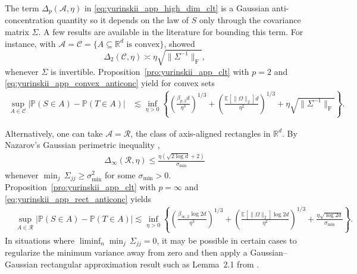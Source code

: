 \documentclass[11pt,lof]{puthesis}
\renewcommand{\P}{\ensuremath{\mathbb{P}}}
\newcommand{\R}{\ensuremath{\mathbb{R}}}
\newcommand{\E}{\ensuremath{\mathbb{E}}}
\newcommand{\rF}{\ensuremath{\mathrm{F}}}
\newcommand{\cR}{\ensuremath{\mathcal{R}}}
\newcommand{\cA}{\ensuremath{\mathcal{A}}}
\newcommand{\cC}{\ensuremath{\mathcal{C}}}
\theoremstyle{break}
\theoremstyle{proof}
\begin{document}
The term $\Delta_p(\cA, \eta)$
in \eqref{eq:yurinskii_app_high_dim_clt} is a Gaussian anti-concentration
quantity so it depends on the law of $S$ only through the covariance matrix
$\Sigma$.
A few results are available in the literature
for bounding this term.
For instance, with
$\cA = \cC = \{A \subseteq \R^d \text{ is convex}\}$,
\citet{nazarov2003maximal} showed
%
\begin{equation}%
  \label{eq:yurinskii_app_convex_anticonc}
  \Delta_2(\cC, \eta)
  \asymp
  \eta\sqrt{\|\Sigma^{-1}\|_{\rF}},
\end{equation}
%
whenever $\Sigma$ is invertible.
Proposition~\ref{pro:yurinskii_app_clt} with $p=2$
and \eqref{eq:yurinskii_app_convex_anticonc} yield for convex sets
%
\begin{align*}
  \sup_{A\in \cC}
  \big|\P(S\in A) -\P(T\in A)\big|
  &\lesssim
  \inf_{\eta > 0}
  \left\{
    \left(\frac{\beta_{p,2} d}{\eta^3}\right)^{1/3}
    + \left(\frac{\E[\|\Omega \|_2] d}{\eta^2}\right)^{1/3}
    + \eta \sqrt{\|\Sigma^{-1}\|_\rF}
  \right\}.
\end{align*}

Alternatively, one can take $\cA = \cR$,
the class of axis-aligned rectangles in $\R^d$.
By Nazarov's Gaussian perimetric inequality
\citep{nazarov2003maximal,chernozhukov2017central},
%
\begin{align}%
  \label{eq:yurinskii_app_rect_anticonc}
  \Delta_\infty(\cR, \eta)
  \leq \frac{\eta (\sqrt{2\log d} + 2)}{\sigma_{\min}}
\end{align}
%
whenever $\min_j \, \Sigma_{j j} \geq \sigma_{\min}^2$
for some $\sigma_{\min}>0$.
Proposition~\ref{pro:yurinskii_app_clt} with $p = \infty$
and \eqref{eq:yurinskii_app_rect_anticonc} yields
%
\begin{align*}%
  &\sup_{A\in \cR}
  \big|\P(S\in A) -\P(T\in A)\big|
  \lesssim
  \inf_{\eta > 0}
  \left\{
    \left(\frac{\beta_{\infty,2} \log 2d}{\eta^3}\right)^{1/3}
    + \left(\frac{\E[\|\Omega \|_2] \log 2d}{\eta^2}\right)^{1/3}
    + \frac{\eta \sqrt{\log 2d}}{\sigma_{\min}}
  \right\}.
\end{align*}
%
In situations where
$\liminf_n \min_j \, \Sigma_{j j} = 0$,
it may be possible in certain cases to regularize
the minimum variance away from zero and then apply
a Gaussian--Gaussian rectangular approximation result
such as Lemma~2.1 from \citet{chernozhukov2023nearly}.
\end{document}
